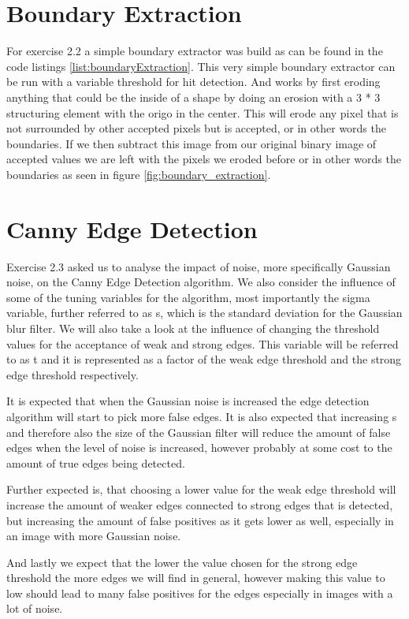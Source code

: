 \documentclass[10pt,a4paper]{article}
\begin{document}
\section{Boundary Extraction}
For exercise 2.2 a simple boundary extractor was build as can be found in the code listings \ref{list:boundaryExtraction}. This very simple boundary extractor can be run with a variable threshold for hit detection. And works by first eroding anything that could be the inside of a shape by doing an erosion with a 3 * 3 structuring element with the origo in the center. This will erode any pixel that is not surrounded by other accepted pixels but is accepted, or in other words the boundaries. If we then subtract this image from our original binary image of accepted values we are left with the pixels we eroded before or in other words the boundaries as seen in figure \ref{fig:boundary_extraction}.

\section{Canny Edge Detection}
Exercise 2.3 asked us to analyse the impact of noise, more specifically Gaussian noise, on the Canny Edge Detection algorithm. We also consider the influence of some of the tuning variables for the algorithm, most importantly the sigma variable, further referred to as s, which is the standard deviation for the Gaussian blur filter. We will also take a  look at the influence of changing the threshold values for the acceptance of weak and strong edges. This variable will be referred to as t and it is represented as a factor of the weak edge threshold and the strong edge threshold respectively.

It is expected that when the Gaussian noise is increased the edge detection algorithm will start to pick more false edges. It is also expected that increasing s and therefore also the size of the Gaussian filter will reduce the amount of false edges when the level of noise is increased, however probably at some cost to the amount of true edges being detected.

Further expected is, that choosing a lower value for the weak edge threshold will increase the amount of weaker edges connected to strong edges that is detected, but increasing the amount of false positives as it gets lower as well, especially in an image with more Gaussian noise. 

And lastly we expect that the lower the value chosen for the strong edge threshold the more edges we will find in general, however making this value to low should lead to many false positives for the edges especially in images with a lot of noise.
\end{document}
